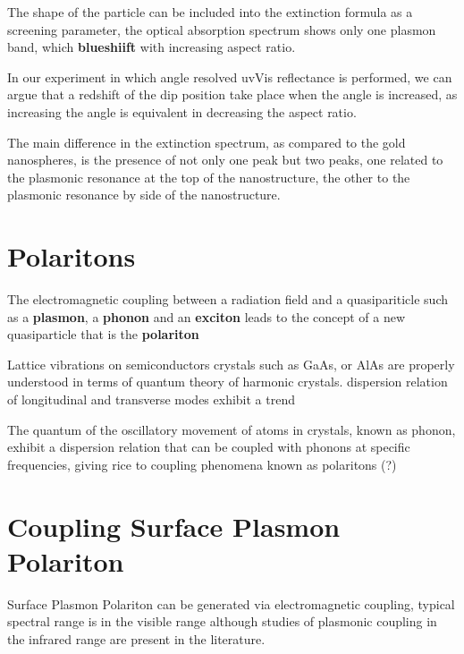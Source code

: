 The shape of the particle can be included into the extinction formula as a screening parameter, the optical absorption spectrum shows only one plasmon band, which {\bf blueshiift} with increasing aspect ratio.

In our experiment in which angle resolved uvVis reflectance is performed, we can argue that a redshift of the dip position take place when the angle is increased, as increasing the angle is equivalent in decreasing the aspect ratio.

The main difference in the extinction spectrum, as compared to the gold nanospheres, is the presence of not only one peak but two peaks, one related to the plasmonic resonance at the top of the nanostructure, the other to the plasmonic resonance by side of the nanostructure.

\section{Polaritons}



The electromagnetic coupling between a radiation field and a quasipariticle such as a {\bf plasmon}, a {\bf phonon} and an {\bf exciton} leads to the concept of a new quasiparticle that is the {\bf polariton}



Lattice vibrations on semiconductors crystals such as GaAs, or AlAs are properly understood in terms of quantum theory of harmonic crystals. dispersion relation of longitudinal and transverse modes exhibit a trend 

The quantum of the oscillatory movement of atoms in crystals, known as phonon,
exhibit a dispersion relation that can be coupled with phonons at specific frequencies, giving rice to coupling phenomena known as polaritons (?)



\section{Coupling Surface Plasmon Polariton}

Surface Plasmon Polariton can be generated via electromagnetic coupling, typical spectral range is in the visible range although studies of plasmonic coupling in the infrared range are present in the literature.

